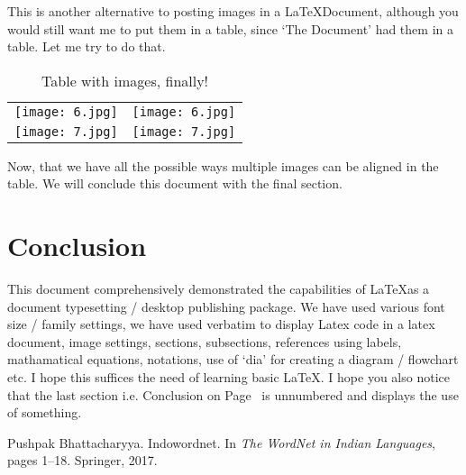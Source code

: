\documentclass[12pt,a4paper,titlepage]{article}
\begin{document}
This is another alternative to posting images in a \LaTeX Document, although you would still want me to put them in a table, since `The Document' had them in a table. Let me try to do that.
\begin{table}[H]
\caption{Table with images, finally!}
\centering
\begin{tabular} {c c}
  \texttt{[image: 6.jpg]} &\texttt{[image: 6.jpg]} \\
  \texttt{[image: 7.jpg]} &\texttt{[image: 7.jpg]} \\
\end{tabular}
\end{table}

Now, that we have all the possible ways multiple images can be aligned in the table. We will conclude this document with the final section.

\section*{Conclusion}
\label{sec:conclusion}
This document comprehensively demonstrated the capabilities of \LaTeX as a document typesetting / desktop publishing package. We have used various font size / family settings, we have used verbatim to display Latex code in a latex document, image settings, sections, subsections, references using labels, mathamatical equations, notations, use of `dia' for creating a diagram / flowchart etc. I hope this suffices the need of learning basic \LaTeX. I hope you also notice that the last section i.e. Conclusion on Page~\pageref{sec:conclusion} is unnumbered and displays the use of something.

\begin{thebibliography}{1}
Pushpak Bhattacharyya.
Indowordnet. In \textit{The WordNet in Indian Languages}, pages 1--18. Springer, 2017.
\end{thebibliography}
\end{document}
